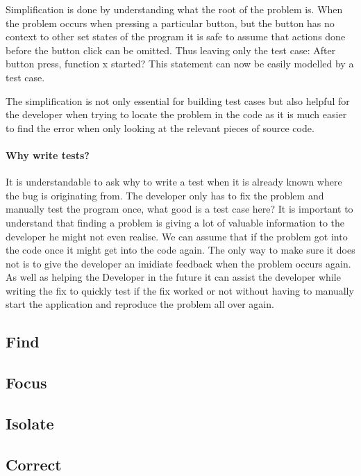 Simplification is done by understanding what the root of the problem is. When the problem occurs when pressing a particular button, but the button has no context to other set states of the program it is safe to assume that actions done before the button click can be omitted. Thus leaving only the test case: After button press, function x started? This statement can now be easily modelled by a test case.

The simplification is not only essential for building test cases but also helpful for the developer when trying to locate the problem in the code as it is much easier to find the error when only looking at the relevant pieces of source code.

\paragraph{Why write tests?}
It is understandable to ask why to write a test when it is already known where the bug is originating from. The developer only has to fix the problem and manually test the program once, what good is a test case here?
It is important to understand that finding a problem is giving a lot of valuable information to the developer he might not even realise. We can assume that if the problem got into the code once it might get into the code again. The only way to make sure it does not is to give the developer an imidiate feedback when the problem occurs again. As well as helping the Developer in the future it can assist the developer while writing the fix to quickly test if the fix worked or not without having to manually start the application and reproduce the problem all over again.

\subsection{Find}
\subsection{Focus}
\subsection{Isolate}
\subsection{Correct}
